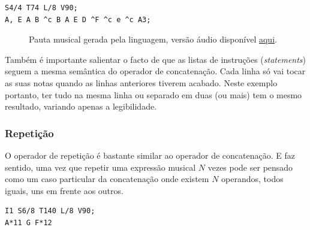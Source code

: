 \begin{lstlisting}[caption={Excerto da música \textit{Wet Hands} de C418},label=lst:ops-concat,belowcaptionskip=-\medskipamount]
S4/4 T74 L/8 V90;
A, E A B ^c B A E D ^F ^c e ^c A3;
\end{lstlisting}


\begin{figure}[ht]
  \centering
  {%
  \setlength{\fboxsep}{0pt}%
  \setlength{\fboxrule}{0pt}%
  }%
  \caption{Pauta musical gerada pela linguagem\protect\footnotemark, versão áudio disponível \href{https://drive.google.com/open?id=1TP4lcul81s8iMCUFmD3HKnSpeftCzKT0}{\underline{aqui}}\protect\footnotemark.}
  \label{fig:ops-concat}
\end{figure}


Também é importante salientar o facto de que as listas de instruções (\textit{statements}) seguem a mesma semântica do operador de concatenação. Cada linha só vai tocar as suas notas quando as linhas anteriores tiverem acabado. Neste exemplo portanto, ter tudo na mesma linha ou separado em duas (ou mais) tem o mesmo resultado, variando apenas a legibilidade.

\subsubsection{Repetição}
O operador de repetição é bastante similar ao operador de concatenação. E faz sentido, uma vez que repetir uma expressão musical $N$ vezes pode ser pensado como um caso particular da concatenação onde existem $N$ operandos, todos iguais, uns em frente aos outros.

\begin{lstlisting}[caption={Excerto do começo do tema principal de Westworld, por Ramin Djawadi},label=lst:ops-repetition,belowcaptionskip=-\medskipamount]
I1 S6/8 T140 L/8 V90;
A*11 G F*12
\end{lstlisting}

